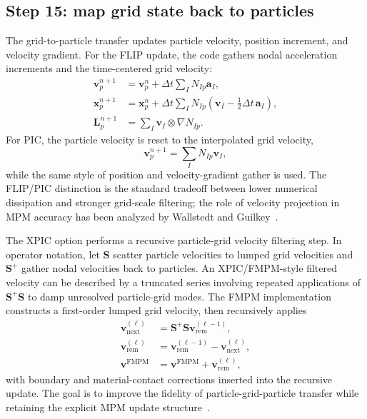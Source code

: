 \subsection{Step 15: map grid state back to particles}
\label{subsec:solver-step-15}
The grid-to-particle transfer updates particle velocity, position increment, and velocity gradient.  For the FLIP update, the code gathers nodal acceleration increments and the time-centered grid velocity:
\begin{align}
  \mathbf{v}^{n+1}_p &= \mathbf{v}^{n}_p + \Delta t\sum_I N_{Ip}\mathbf{a}_I, \\
  \mathbf{x}^{n+1}_p &= \mathbf{x}^{n}_p + \Delta t\sum_I N_{Ip}\left(\mathbf{v}_I - \frac{1}{2}\Delta t\,\mathbf{a}_I\right), \\
  \mathbf{L}^{n+1}_p &= \sum_I \mathbf{v}_I \otimes \nabla N_{Ip}.
\end{align}
For PIC, the particle velocity is reset to the interpolated grid velocity,
\begin{equation}
  \mathbf{v}^{n+1}_p = \sum_I N_{Ip}\mathbf{v}_I,
\end{equation}
while the same style of position and velocity-gradient gather is used.  The FLIP/PIC distinction is the standard tradeoff between lower numerical dissipation and stronger grid-scale filtering; the role of velocity projection in MPM accuracy has been analyzed by Wallstedt and Guilkey~\cite{wallstedt2007projection}.

The XPIC option performs a recursive particle-grid velocity filtering step.  In operator notation, let $\mathbf{S}$ scatter particle velocities to lumped grid velocities and $\mathbf{S}^{+}$ gather nodal velocities back to particles.  An XPIC/FMPM-style filtered velocity can be described by a truncated series involving repeated applications of $\mathbf{S}^{+}\mathbf{S}$ to damp unresolved particle-grid modes.  The FMPM implementation constructs a first-order lumped grid velocity, then recursively applies
\begin{align}
  \mathbf{v}^{(\ell)}_{\mathrm{next}} &= \mathbf{S}^{+}\mathbf{S}\mathbf{v}^{(\ell-1)}_{\mathrm{rem}}, \\
  \mathbf{v}^{(\ell)}_{\mathrm{rem}} &= \mathbf{v}^{(\ell-1)}_{\mathrm{rem}}-\mathbf{v}^{(\ell)}_{\mathrm{next}}, \\
  \mathbf{v}^{\mathrm{FMPM}} &= \mathbf{v}^{\mathrm{FMPM}}+\mathbf{v}^{(\ell)}_{\mathrm{rem}},
\end{align}
with boundary and material-contact corrections inserted into the recursive update.  The goal is to improve the fidelity of particle-grid-particle transfer while retaining the explicit MPM update structure~\cite{hammerquist2017xpic,nairn2021fmpm}.

